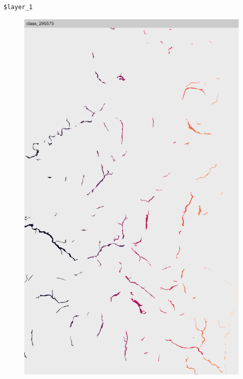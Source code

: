 \documentclass[
  letterpaper,
  DIV=11,
  numbers=noendperiod]{scrartcl}
\newenvironment{Shaded}{\begin{snugshade}}{\end{snugshade}}
\newcommand{\AttributeTok}[1]{\textcolor[rgb]{0.40,0.45,0.13}{#1}}
\newcommand{\ConstantTok}[1]{\textcolor[rgb]{0.56,0.35,0.01}{#1}}
\newcommand{\FunctionTok}[1]{\textcolor[rgb]{0.28,0.35,0.67}{#1}}
\newcommand{\NormalTok}[1]{\textcolor[rgb]{0.00,0.23,0.31}{#1}}
\newcommand{\OtherTok}[1]{\textcolor[rgb]{0.00,0.23,0.31}{#1}}
\newcommand{\SpecialCharTok}[1]{\textcolor[rgb]{0.37,0.37,0.37}{#1}}
\newcommand{\StringTok}[1]{\textcolor[rgb]{0.13,0.47,0.30}{#1}}
\begin{document}
\begin{verbatim}
$layer_1
\end{verbatim}

\begin{figure}[H]

{\centering \includegraphics{PatternAnalysisWorkshopTutorial_files/figure-pdf/show.landscape.gn-2.pdf}

}

\end{figure}

\begin{Shaded}
\end{Shaded}
\end{document}
